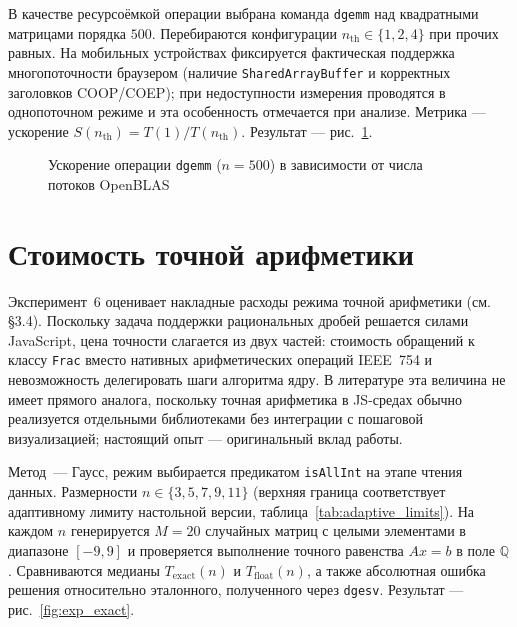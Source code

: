 \documentclass[12pt, oneside]{book}
\begin{document}
    \quad В качестве ресурсоёмкой операции выбрана команда \texttt{dgemm} над квадратными матрицами порядка $500$. Перебираются конфигурации $n_\text{th} \in \{1, 2, 4\}$ при прочих равных. На мобильных устройствах фиксируется фактическая поддержка многопоточности браузером (наличие \texttt{SharedArrayBuffer} и корректных заголовков COOP/COEP); при недоступности измерения проводятся в однопоточном режиме и эта особенность отмечается при анализе. Метрика --- ускорение $S(n_\text{th}) = T(1) / T(n_\text{th})$. Результат --- рис.~\ref{fig:exp_threads}.

\begin{figure}[htbp]
\centering
{}
\caption{Ускорение операции \texttt{dgemm} ($n=500$) в зависимости от числа потоков OpenBLAS}
\label{fig:exp_threads}
\end{figure}

\section{Стоимость точной арифметики}
\label{sec:exp_exact}

    \quad Эксперимент~6 оценивает накладные расходы режима точной арифметики (см. §3.4). Поскольку задача поддержки рациональных дробей решается силами JavaScript, цена точности слагается из двух частей: стоимость обращений к классу \texttt{Frac} вместо нативных арифметических операций IEEE~754 и невозможность делегировать шаги алгоритма ядру. В литературе эта величина не имеет прямого аналога, поскольку точная арифметика в JS-средах обычно реализуется отдельными библиотеками без интеграции с пошаговой визуализацией; настоящий опыт --- оригинальный вклад работы.

    \quad Метод~--- Гаусс, режим выбирается предикатом \texttt{isAllInt} на этапе чтения данных. Размерности $n \in \{3, 5, 7, 9, 11\}$ (верхняя граница соответствует адаптивному лимиту настольной версии, таблица~\ref{tab:adaptive_limits}). На каждом $n$ генерируется $M = 20$ случайных матриц с целыми элементами в диапазоне $[-9, 9]$ и проверяется выполнение точного равенства $A x = b$ в поле $\mathbb{Q}$. Сравниваются медианы $T_\text{exact}(n)$ и $T_\text{float}(n)$, а также абсолютная ошибка решения относительно эталонного, полученного через \texttt{dgesv}. Результат --- рис.~\ref{fig:exp_exact}.
\end{document}
